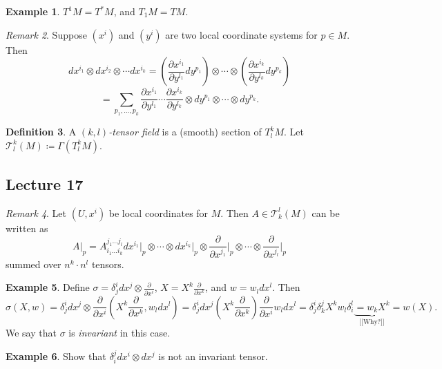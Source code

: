 \documentclass[10pt,letterpaper,cm]{nupset}
\theoremstyle{definition}
\newtheorem{definition}{Definition}[subsection]
\newtheorem{exmp}[definition]{Example}
\theoremstyle{theorem}
\theoremstyle{remark}
\newtheorem{remark}[definition]{Remark}
\newcommand{\T}{\mathcal T}
\newcommand{\1}{\mathbf{1}}
\newcommand{\0}{\vec 0}
\begin{document}
\begin{exmp}
$T^1 M = T^{\ast}M$, and $T_1 M = TM$.
\end{exmp}

\begin{remark}
Suppose $(x^i)$ and $(y^i)$ are two local coordinate systems for $p\in M$. Then $$dx^{i_1} \otimes dx^{i_2} \otimes \cdots dx^{i_k} = (\frac{\partial{x^{i_1}}}{\partial{y^{l_1}}} dy^{p_1}) \otimes \cdots \otimes (\frac{\partial{x^{i_k}}}{\partial{y^{l_k}}} dy^{p_k})$$ $$ = \sum_{p_1, \ldots, p_k} \frac{\partial{x^{i_1}}}{\partial{y^{l_1}}}\cdots \frac{\partial{x^{i_k}}}{\partial{y^{l_k}}}  \otimes dy^{p_1} \otimes \cdots \otimes dy^{p_k}.$$
\end{remark}

\begin{definition}
A \textit{$(k, l)$-tensor field} is a (smooth) section of $T_l^kM$. Let $\T_l^k(M)\coloneqq  \Gamma(T_l^kM)$.
\end{definition}

\subsection{Lecture 17}

\begin{remark}
Let $(U, x^i)$ be local coordinates for $M$. Then $A \in \T_k^l(M)$ can be written as $$A\rvert_p = A_{i_1 \ldots i_k}^{j_1\ldots j_l} dx^{i_1}\rvert_p \otimes \cdots \otimes dx^{i_k}\rvert_p \otimes \frac{\partial}{\partial{x^{j_1}}}\rvert_p \otimes \cdots \otimes \frac{\partial}{\partial{x^{j_l}}}\rvert_p$$ summed over $n^k\cdot n^l$ tensors.
\end{remark}

\begin{exmp}
Define $\sigma = \delta_j^i dx^j \otimes \frac{\partial}{\partial{x^i}}$, $X = X^k \frac{\partial}{\partial{x^k}}$, and $w = w_ldx^l$. Then $$\sigma(X, w) = \delta_j^i dx^j \otimes \frac{\partial}{\partial{x^i}}(X^k \frac{\partial}{\partial{x^k}}, w_ldx^l) = \delta_j^i dx^j (X^k \frac{\partial}{\partial{x^k}}) \frac{\partial}{\partial{x^i}} w_ldx^l = \delta_j^i \delta_k^j X^k w_l\delta_i^l \underbrace{= w_kX^k}_{\text{[[Why?]]}} = w(X).$$ We say that $\sigma$ is \textit{invariant} in this case.
\end{exmp}

\begin{exmp}
Show that $\delta_i^j dx^i \otimes dx^j$ is not an invariant tensor. 
\end{exmp}
\end{document}
